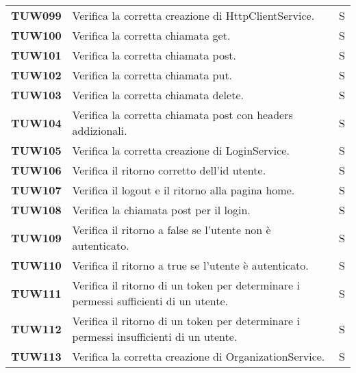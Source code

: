 \documentclass[../piano-di-qualifica.tex]{subfiles}
\begin{document}
\begin{longtable}[H]{>{\centering\bfseries}m{3cm} >{}m{10cm} >{\centering\arraybackslash}m{3cm}}

TUW099             & Verifica la corretta creazione di HttpClientService. & S \\ 

TUW100             & Verifica la corretta chiamata get. & S \\ 

TUW101             & Verifica la corretta chiamata post. & S \\ 

TUW102             & Verifica la corretta chiamata put. & S \\ 

TUW103             & Verifica la corretta chiamata delete. & S \\ 

TUW104             & Verifica la corretta chiamata post con headers addizionali. & S \\ 


TUW105             & Verifica la corretta creazione di LoginService. & S \\ 

TUW106             & Verifica il ritorno corretto dell'id utente. & S \\ 
 
TUW107             & Verifica il logout e il ritorno alla pagina home. & S \\ 

TUW108             & Verifica la chiamata post per il login. & S \\ 

TUW109             & Verifica il ritorno a false se l'utente non è autenticato. & S \\ 

TUW110             & Verifica il ritorno a true se l'utente è autenticato. & S \\ 

TUW111             & Verifica il ritorno di un token per determinare i permessi sufficienti di un utente. & S \\ 

TUW112             & Verifica il ritorno di un token per determinare i permessi insufficienti di un utente. & S \\ 



TUW113             & Verifica la corretta creazione di OrganizationService. & S \\ 


\end{longtable}
\end{document}
